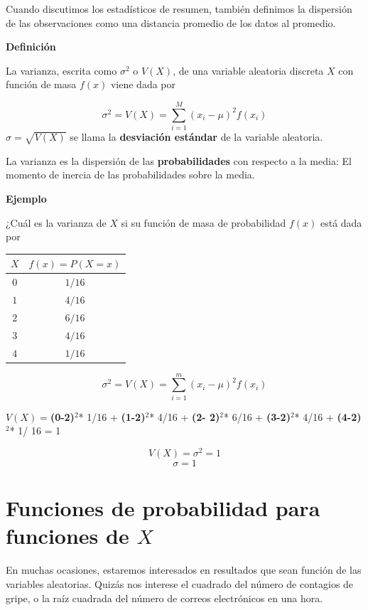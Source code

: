 \documentclass[
]{book}
\begin{document}
Cuando discutimos los estadísticos de resumen, también definimos la dispersión de las observaciones como una distancia promedio de los datos al promedio.

\textbf{Definición}

La varianza, escrita como \(\sigma^2\) o \(V(X)\), de una variable aleatoria discreta \(X\) con función de masa \(f(x)\) viene dada por

\[\sigma^2 = V(X)= \sum_{i=1}^M (x_i-\mu)^2 f(x_i)\]
\(\sigma=\sqrt{V(X)}\) se llama la \textbf{desviación estándar} de la variable aleatoria.

La varianza es la dispersión de las \textbf{probabilidades} con respecto a la media: El momento de inercia de las probabilidades sobre la media.

\textbf{Ejemplo}

¿Cuál es la varianza de \(X\) si su función de masa de probabilidad \(f(x)\) está dada por

\begin{longtable}[]{@{}cc@{}}
\toprule\noalign{}
\(X\) & \(f(x)=P(X=x)\) \\
\midrule\noalign{}
\endhead
\bottomrule\noalign{}
\endlastfoot
\(0\) & \(1/16\) \\
\(1\) & \(4/16\) \\
\(2\) & \(6/16\) \\
\(3\) & \(4/16\) \\
\(4\) & \(1/16\) \\
\end{longtable}

\[\sigma^2 =V(X)=\sum_{i=1}^m (x_i-\mu)^2 f(x_i)\]

\(V(X)=\)\textbf{(0-2)}\(^2\)* 1/16 + \textbf{(1-2)}\(^2\)* 4/16 + \textbf{(2- 2)}\(^2\)* 6/16 + \textbf{(3-2)}\(^2\)* 4/16 + \textbf{(4-2)}\(^2\)* 1/ 16 = 1

\[V(X)=\sigma^2=1\]
\[\sigma=1\]

\hypertarget{funciones-de-probabilidad-para-funciones-de-x}{%
\section{\texorpdfstring{Funciones de probabilidad para funciones de \(X\)}{Funciones de probabilidad para funciones de X}}\label{funciones-de-probabilidad-para-funciones-de-x}}

En muchas ocasiones, estaremos interesados en resultados que sean función de las variables aleatorias. Quizás nos interese el cuadrado del número de contagios de gripe, o la raíz cuadrada del número de correos electrónicos en una hora.
\end{document}
